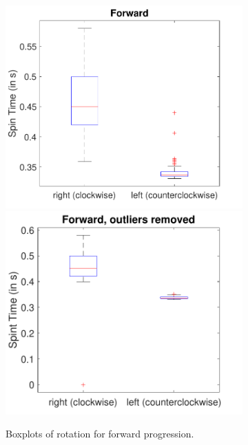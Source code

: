 \documentclass[a4paper,twoside]{book}
\begin{document}
\begin{figure}[h]
  \begin{subfigure}[t]{0.5\textwidth}
  \includegraphics[width=\textwidth, center]{img/forward} 
  \includegraphics[width=\textwidth, center]{img/forward_2}
  \caption{Boxplots of rotation for forward progression.}
  \end{subfigure}
  \begin{subfigure}[t]{0.5\textwidth}

\end{subfigure}
\end{figure}
\end{document}
